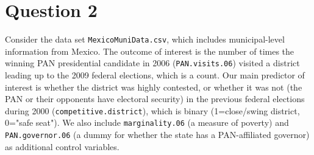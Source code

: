 \documentclass[12pt,letterpaper]{article}
\begin{document}
\newpage
\section*{Question 2} 
\vspace{.25cm}

\noindent Consider the data set \texttt{MexicoMuniData.csv}, which includes municipal-level information from Mexico. The outcome of interest is the number of times the winning PAN presidential candidate in 2006 (\texttt{PAN.visits.06}) visited a district leading up to the 2009 federal elections, which is a count. Our main predictor of interest is whether the district was highly contested, or whether it was not (the PAN or their opponents have electoral security) in the previous federal elections during 2000 (\texttt{competitive.district}), which is binary (1=close/swing district, 0="safe seat"). We also include \texttt{marginality.06} (a measure of poverty) and \texttt{PAN.governor.06} (a dummy for whether the state has a PAN-affiliated governor) as additional control variables. 
\end{document}
